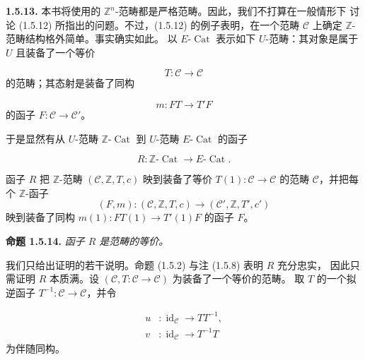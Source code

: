 \clearpage
{}%
\noindent\textbf{1.5.13.}\quad
本书将使用的 $\mathbb Z^n$-范畴都是严格范畴。因此，我们不打算在一般情形下
讨论 (1.5.12) 所指出的问题。不过，(1.5.12) 的例子表明，在一个范畴
$\mathcal C$ 上确定 $\mathbb Z$-范畴结构格外简单。事实确实如此。
以 $E\text{-}\operatorname{Cat}$ 表示如下 $U$-范畴：其对象是属于 $U$
且装备了一个等价

\begin{equation}
  T\colon\mathcal C\longrightarrow\mathcal C
  \tag{1.5.13.1}
\end{equation}
的范畴；其态射是装备了同构

\begin{equation}
  m\colon FT\longrightarrow T'F
  \tag{1.5.13.2}
\end{equation}
的函子 $F\colon\mathcal C\to\mathcal C'$。

于是显然有从 $U$-范畴 $\mathbb Z\text{-}\operatorname{Cat}$ 到
$U$-范畴 $E\text{-}\operatorname{Cat}$ 的函子

\begin{equation}
  R\colon \mathbb Z\text{-}\operatorname{Cat}
  \longrightarrow E\text{-}\operatorname{Cat}.
  \tag{1.5.13.3}
\end{equation}

函子 $R$ 把 $\mathbb Z$-范畴 $(\mathcal C,\mathbb Z,T,c)$ 映到装备了等价
$T(1)\colon\mathcal C\to\mathcal C$ 的范畴 $\mathcal C$，并把每个
$\mathbb Z$-函子
\[
  (F,m)\colon(\mathcal C,\mathbb Z,T,c)
  \longrightarrow(\mathcal C',\mathbb Z,T',c')
\]
映到装备了同构 $m(1)\colon FT(1)\to T'(1)F$ 的函子 $F$。

\noindent\textbf{命题 1.5.14.}\quad
\emph{函子 $R$ 是范畴的等价。}

我们只给出证明的若干说明。命题 (1.5.2) 与注 (1.5.8) 表明 $R$ 充分忠实，
因此只需证明 $R$ 本质满。设
$(\mathcal C,T\colon\mathcal C\to\mathcal C)$ 为装备了一个等价的范畴。
取 $T$ 的一个拟逆函子 $T^{-1}\colon\mathcal C\to\mathcal C$，并令

\begin{equation}
  \begin{aligned}
    u&\colon\operatorname{id}_{\mathcal C}\longrightarrow TT^{-1},\\
    v&\colon\operatorname{id}_{\mathcal C}\longrightarrow T^{-1}T
  \end{aligned}
  \tag{1.5.14.1}
\end{equation}
为伴随同构。

